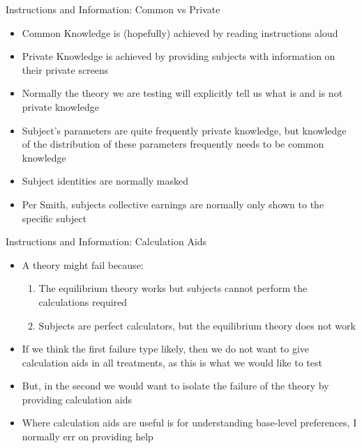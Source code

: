 \documentclass{beamer}
\begin{document}
\begin{frame}{Instructions and Information: Common vs Private}
	\begin{itemize}
		\item Common Knowledge is (hopefully) achieved by reading instructions aloud
		\item Private Knowledge is achieved by providing subjects with information on their private screens\pause
		\item Normally the theory we are testing will explicitly tell us what is and is not private knowledge
		\item Subject's parameters are quite frequently private knowledge, but knowledge of the distribution of these parameters frequently needs to be common knowledge
		\item Subject identities are normally masked
		\item Per Smith, subjects collective earnings are normally only shown to the specific subject
	\end{itemize}
\end{frame}

\begin{frame}{Instructions and Information: Calculation Aids}
	\begin{itemize}
		\item A theory might fail because:
		\begin{enumerate}
			\item The equilibrium theory works but subjects cannot perform the calculations required
			\item Subjects are perfect calculators, but the equilibrium theory does not work
		\end{enumerate}\pause
		\item If we think the first failure type likely, then we do not want to give calculation aids in all treatments, as this is what we would like to test
		\item But, in the second we would want to isolate the failure of the theory by providing calculation aids
		\pause
		\item Where calculation aids are useful is for understanding base-level preferences, I normally err on providing help
	\end{itemize}
\end{frame}
\end{document}
